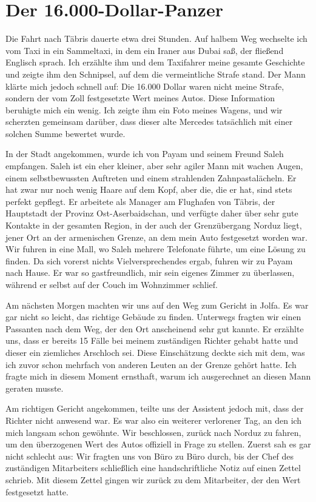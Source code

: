 \chapter*{Der 16.000-Dollar-Panzer}

Die Fahrt nach Täbris dauerte etwa drei Stunden. Auf halbem Weg wechselte ich vom Taxi in ein Sammeltaxi, in dem ein Iraner aus Dubai saß, der fließend Englisch sprach. Ich erzählte ihm und dem Taxifahrer meine gesamte Geschichte und zeigte ihm den Schnipsel, auf dem die vermeintliche Strafe stand. Der Mann klärte mich jedoch schnell auf: Die 16.000 Dollar waren nicht meine Strafe, sondern der vom Zoll festgesetzte Wert meines Autos. Diese Information beruhigte mich ein wenig. Ich zeigte ihm ein Foto meines Wagens, und wir scherzten gemeinsam darüber, dass dieser alte Mercedes tatsächlich mit einer solchen Summe bewertet wurde.

In der Stadt angekommen, wurde ich von Payam und seinem Freund Saleh empfangen. Saleh ist ein eher kleiner, aber sehr agiler Mann mit wachen Augen, einem selbstbewussten Auftreten und einem strahlenden Zahnpastalächeln. Er hat zwar nur noch wenig Haare auf dem Kopf, aber die, die er hat, sind stets perfekt gepflegt. Er arbeitete als Manager am Flughafen von Täbris, der Hauptstadt der Provinz Ost-Aserbaidschan, und verfügte daher über sehr gute Kontakte in der gesamten Region, in der auch der Grenzübergang Norduz liegt, jener Ort an der armenischen Grenze, an dem mein Auto festgesetzt worden war. Wir fuhren in eine Mall, wo Saleh mehrere Telefonate führte, um eine Lösung zu finden. Da sich vorerst nichts Vielversprechendes ergab, fuhren wir zu Payam nach Hause. Er war so gastfreundlich, mir sein eigenes Zimmer zu überlassen, während er selbst auf der Couch im Wohnzimmer schlief.

Am nächsten Morgen machten wir uns auf den Weg zum Gericht in Jolfa. Es war gar nicht so leicht, das richtige Gebäude zu finden. Unterwegs fragten wir einen Passanten nach dem Weg, der den Ort anscheinend sehr gut kannte. Er erzählte uns, dass er bereits 15 Fälle bei meinem zuständigen Richter gehabt hatte und dieser ein ziemliches Arschloch sei. Diese Einschätzung deckte sich mit dem, was ich zuvor schon mehrfach von anderen Leuten an der Grenze gehört hatte. Ich fragte mich in diesem Moment ernsthaft, warum ich ausgerechnet an diesen Mann geraten musste.

Am richtigen Gericht angekommen, teilte uns der Assistent jedoch mit, dass der Richter nicht anwesend war. Es war also ein weiterer verlorener Tag, an den ich mich langsam schon gewöhnte. Wir beschlossen, zurück nach Norduz zu fahren, um den überzogenen Wert des Autos offiziell in Frage zu stellen. Zuerst sah es gar nicht schlecht aus: Wir fragten uns von Büro zu Büro durch, bis der Chef des zuständigen Mitarbeiters schließlich eine handschriftliche Notiz auf einen Zettel schrieb. Mit diesem Zettel gingen wir zurück zu dem Mitarbeiter, der den Wert festgesetzt hatte.

